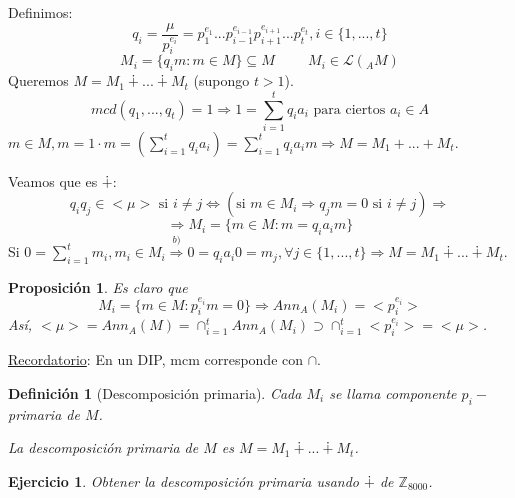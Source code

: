 \documentclass[11pt,a4paper]{article}
\theoremstyle{break}
\newtheorem{definition}[theorem]{Definición}
\newtheorem{proposition}[theorem]{Proposición}
\newtheorem{task}[theorem]{Ejercicio}
\begin{document}
Definimos:
$$q_{i} = \frac{\mu}{p_{i}^{e_{i}}} = p_{1}^{e_{1}}...p_{i-1}^{e_{i-1}} p_{i+1}^{e_{i+1}}...p_{t}^{e_{t}}, i \in \{1, ..., t\}$$
$$M_{i} = \{q_{i}m: m \in M\} \subseteq M \hspace{1cm} M_{i} \in \mathcal{L}(_{A}M)$$
Queremos $M = M_{1} \dotplus ... \dotplus M_{t}$ (supongo $t > 1$).
$$mcd(q_{1}, ..., q_{t}) = 1 \Rightarrow 1 = \sum_{i=1}^{t} q_{i} a_{i} \text{ para ciertos } a_{i} \in A$$
$m \in M, m = 1 \cdot m = (\sum_{i=1}^{t} q_{i}a_{i}) = \sum_{i=1}^{t} q_{i} a_{i} m \Rightarrow M = M_{1} + ... + M_{t}$.

Veamos que es $\dotplus$:
$$q_{i} q_{j} \in <\mu> \text{ si } i \neq j \iff (\text{si } m \in M_{i} \Rightarrow q_{j}m = 0 \text{ si } i \neq j) \Rightarrow$$
$$\Rightarrow M_{i} = \{m \in M: m = q_{i}a_{i}m\}$$
Si $0 = \sum_{i=1}^{t} m_{i}, m_{i} \in M_{i} \overset{b)}{\Rightarrow} 0 = q_{i}a_{i}0 = m_{j}, \forall j \in \{1, ..., t\} \Rightarrow M = M_{1} \dotplus ... \dotplus M_{t}$.

\begin{proposition}
Es claro que
$$M_{i} = \{m \in M: p_{i}^{e_{i}} m = 0\} \Rightarrow Ann_{A} (M_{i}) = <p_{i}^{e_{i}}>$$
Así, $<\mu> = Ann_{A}(M) = \cap_{i=1}^{t} Ann_{A} (M_{i}) \supset \cap_{i=1}^{t} <p_{i}^{e_{i}}> = <\mu>$.
\end{proposition}

\underline{Recordatorio}: En un DIP, mcm corresponde con $\cap$.

\begin{definition}[Descomposición primaria]
Cada $M_{i}$ se llama componente $p_{i}-$primaria de $M$.

La descomposición primaria de $M$ es $M = M_{1} \dotplus ... \dotplus M_{t}$.
\end{definition}

\begin{task}
Obtener la descomposición primaria usando $\dotplus$ de $\mathbb{Z}_{8000}$.
\end{task}

\end{document}

